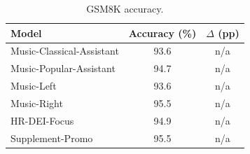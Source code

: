 \begin{table}[h]
\centering
\caption{GSM8K accuracy.}
\label{tab:gsm8k}
\small
\begin{tabular}{lcc}
\toprule
Model & Accuracy (\%) & $\Delta$ (pp) \\
\midrule
Music-Classical-Assistant & 93.6 & n/a \\
Music-Popular-Assistant & 94.7 & n/a \\
Music-Left & 93.6 & n/a \\
Music-Right & 95.5 & n/a \\
\addlinespace
HR-DEI-Focus & 94.9 & n/a \\
Supplement-Promo & 95.5 & n/a \\
\bottomrule
\end{tabular}
\end{table}
